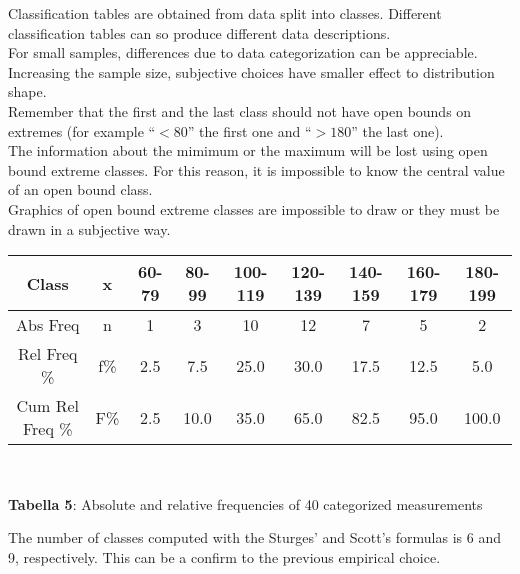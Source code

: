 \begin{frame}
  \begin{small}
    Classification tables are obtained from data split into classes. Different classification tables can so produce different data descriptions.\\
    \vspace*{.25cm}
    For small samples, differences due to data categorization can be appreciable. Increasing the sample size, subjective choices have smaller effect to distribution shape.\\
    \vspace*{.25cm}
    Remember that the first and the last class should not have open bounds on extremes (for example ``$<80$'' the first one and ``$>180$'' the last one).\\
    \vspace*{.25cm}
    The information about the mimimum or the maximum will be lost using open bound extreme classes. For this reason, it is impossible to know the central value of an open bound class.\\
    \vspace*{.25cm}
    Graphics of open bound extreme classes are impossible to draw or they must be drawn in a subjective way.
  \end{small}
\end{frame}

\begin{frame}
  \vspace*{.5cm}
  \begin{table}
    \centering
    \begin{tiny}
      \begin{tabular}{|*{9}{c|}}
        \hline
        \textbf{Class} & \textbf{x} & \textbf{60-79} & \textbf{80-99} & \textbf{100-119} & \textbf{120-139} & \textbf{140-159} & \textbf{160-179} & \textbf{180-199}\\
        \hline
        Abs Freq & n & 1 & 3 & 10 & 12 & 7 & 5 & 2\\
        \hline
        Rel Freq \% & f\% & 2.5 & 7.5 & 25.0 & 30.0 & 17.5 & 12.5 & 5.0\\
        \hline
        Cum Rel Freq \% & F\% & 2.5 & 10.0 & 35.0 & 65.0 & 82.5 & 95.0 & 100.0\\
        \hline
      \end{tabular}\\
    \end{tiny}
    \vspace*{.2cm}
    \begin{scriptsize}
      \textbf{Tabella 5}: Absolute and relative frequencies of 40 categorized measurements
    \end{scriptsize}
  \end{table}
  \vspace*{.5cm}
  The number of classes computed with the Sturges' and Scott's formulas is 6 and 9, respectively. This can be a confirm to the previous empirical choice.
\end{frame}

